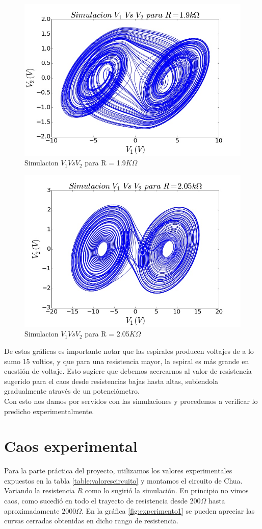 \documentclass[%
 reprint,
 amsmath,amssymb,
 aps,
]{revtex4-1}
\begin{document}
\begin{figure}
\centering
\includegraphics[width=0.7\linewidth]{"simulacion"}
\caption{Simulacion $V_1 Vs V_2$ para R = 1.9$K\Omega$}
\label{fig:simulacion}
\end{figure}

\begin{figure}
\centering
\includegraphics[width=0.7\linewidth]{"simulacion2"}
\caption{Simulacion $V_1 Vs V_2$ para R = 2.05$K\Omega$}
\label{fig:simulacion2}
\end{figure}

De estas gráficas es importante notar que las espirales producen voltajes de a lo sumo 15 voltios, y que para una resistencia mayor, la espiral es más grande en cuestión de voltaje. Esto sugiere que debemos acercarnos al valor de resistencia sugerido para el caos desde resistencias bajas hasta altas, subiendola gradualmente através de un potenciómetro.\\

Con esto nos damos por servidos con las simulaciones y procedemos a verificar lo predicho experimentalmente.\\
\section{\label{sec:level1}Caos experimental}
Para la parte práctica del proyecto, utilizamos los valores experimentales expuestos en la tabla \ref{table:valorescircuito} y montamos el circuito de Chua. Variando la resistencia $R$ como lo sugirió la simulación. En principio no vimos caos, como sucedió en todo el trayecto de resistencia desde $200\Omega$ hasta aproximadamente $2000\Omega$. En la gráfica \ref{fig:experimento1} se pueden apreciar las curvas cerradas obtenidas en dicho rango de resistencia.\
\end{document}
